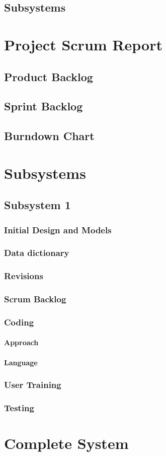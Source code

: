 \documentclass{article}
\begin{document}
\subsection{Subsystems}

\section{Project Scrum Report}

\subsection{Product Backlog} %

\subsection{Sprint Backlog} %

\subsection{Burndown Chart}

\section{Subsystems}
\subsection{Subsystem 1}
\subsubsection{Initial Design and Models}
\subsubsection{Data dictionary}
\subsubsection{Revisions}
\subsubsection{Scrum Backlog } %
\subsubsection{Coding}
\paragraph{Approach}
\paragraph{Language}
\subsubsection{User Training}
\subsubsection{Testing}
\section{Complete System}
\end{document}
